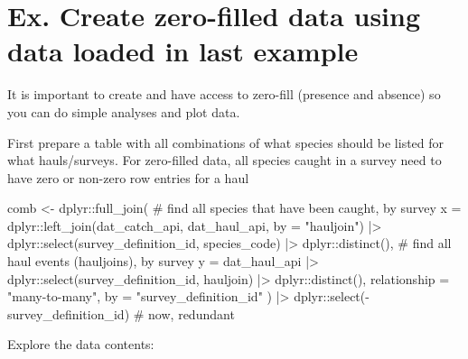 \documentclass[
  letterpaper,
  oneside,
  open=any]{scrbook}
\newenvironment{Shaded}{\begin{snugshade}}{\end{snugshade}}
\newcommand{\AttributeTok}[1]{\textcolor[rgb]{0.40,0.45,0.13}{#1}}
\newcommand{\CommentTok}[1]{\textcolor[rgb]{0.37,0.37,0.37}{#1}}
\newcommand{\FunctionTok}[1]{\textcolor[rgb]{0.28,0.35,0.67}{#1}}
\newcommand{\NormalTok}[1]{\textcolor[rgb]{0.00,0.23,0.31}{#1}}
\newcommand{\OtherTok}[1]{\textcolor[rgb]{0.00,0.23,0.31}{#1}}
\newcommand{\SpecialCharTok}[1]{\textcolor[rgb]{0.37,0.37,0.37}{#1}}
\newcommand{\StringTok}[1]{\textcolor[rgb]{0.13,0.47,0.30}{#1}}
\begin{document}
\section{Ex. Create zero-filled data using data loaded in last
example}\label{ex.-create-zero-filled-data-using-data-loaded-in-last-example}

It is important to create and have access to zero-fill (presence and
absence) so you can do simple analyses and plot data.

First prepare a table with all combinations of what species should be
listed for what hauls/surveys. For zero-filled data, all species caught
in a survey need to have zero or non-zero row entries for a haul

\begin{Shaded}
\begin{Highlighting}[]
\NormalTok{comb }\OtherTok{\textless{}{-}}\NormalTok{ dplyr}\SpecialCharTok{::}\FunctionTok{full\_join}\NormalTok{(}
  \CommentTok{\# find all species that have been caught, by survey}
  \AttributeTok{x =}\NormalTok{ dplyr}\SpecialCharTok{::}\FunctionTok{left\_join}\NormalTok{(dat\_catch\_api, dat\_haul\_api, }\AttributeTok{by =} \StringTok{"hauljoin"}\NormalTok{) }\SpecialCharTok{|\textgreater{}}
\NormalTok{    dplyr}\SpecialCharTok{::}\FunctionTok{select}\NormalTok{(survey\_definition\_id, species\_code) }\SpecialCharTok{|\textgreater{}}
\NormalTok{    dplyr}\SpecialCharTok{::}\FunctionTok{distinct}\NormalTok{(),}
  \CommentTok{\# find all haul events (hauljoins), by survey}
  \AttributeTok{y =}\NormalTok{ dat\_haul\_api }\SpecialCharTok{|\textgreater{}}
\NormalTok{    dplyr}\SpecialCharTok{::}\FunctionTok{select}\NormalTok{(survey\_definition\_id, hauljoin) }\SpecialCharTok{|\textgreater{}}
\NormalTok{    dplyr}\SpecialCharTok{::}\FunctionTok{distinct}\NormalTok{(),}
  \AttributeTok{relationship =} \StringTok{"many{-}to{-}many"}\NormalTok{,}
  \AttributeTok{by =} \StringTok{"survey\_definition\_id"}
\NormalTok{) }\SpecialCharTok{|\textgreater{}} 
\NormalTok{  dplyr}\SpecialCharTok{::}\FunctionTok{select}\NormalTok{(}\SpecialCharTok{{-}}\NormalTok{survey\_definition\_id) }\CommentTok{\# now, redundant}
\end{Highlighting}
\end{Shaded}

Explore the data contents:
\end{document}
